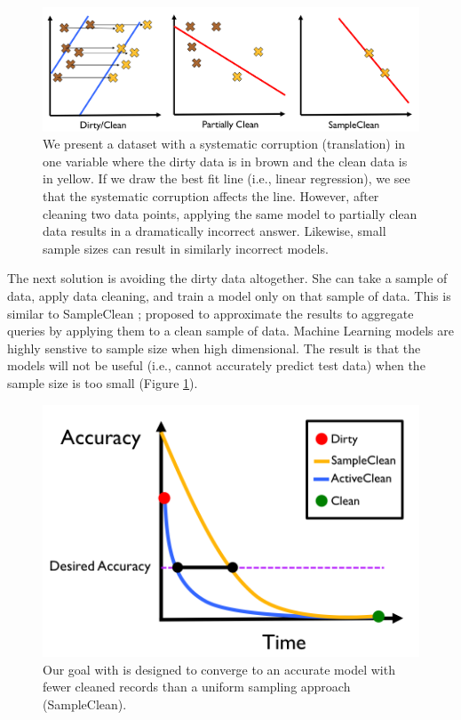 \begin{figure}[ht!]
\centering
 \includegraphics[width=\columnwidth]{figs/update-arch.png}
 \caption{We present a dataset with a systematic corruption (translation) in one variable where the dirty data is in brown and the clean data is in yellow. If we draw the best fit line (i.e., linear regression), we see that the systematic corruption affects the line.
 However, after cleaning two data points, applying the same model to partially clean data results in a dramatically incorrect answer.
Likewise, small sample sizes can result in similarly incorrect models. \label{update-arch1}}
\end{figure}

The next solution is avoiding the dirty data altogether.
She can take a sample of data, apply data cleaning, and train a model only on that sample of data.
This is similar to SampleClean \cite{wang1999sample}; proposed to approximate the results to aggregate queries by applying them to a clean sample of data.
Machine Learning models are highly senstive to sample size when high dimensional.
The result is that the models will not be useful (i.e., cannot accurately predict test data) when the sample size is too small (Figure \ref{update-arch1}).

\begin{figure}[t]
\centering
 \includegraphics[width=0.6\columnwidth]{figs/arch2.png}
 \caption{Our goal with \sys is designed to converge to an accurate model with fewer cleaned records than a uniform sampling approach (SampleClean). \label{sys-arch2}}
\end{figure}

